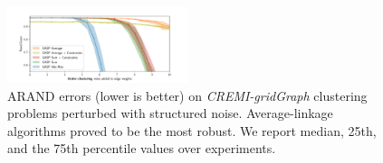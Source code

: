 

\begin{figure}[t]
\centering
\includegraphics[width=0.47\textwidth,trim=0.53in 0.1in 0.65in 0.45in,clip]{./figs/noise_plots/under_segment_plots_1.pdf}
        \caption{
ARAND errors (lower is better) on \emph{CREMI-gridGraph} clustering problems perturbed with structured noise. Average-linkage algorithms proved to be the most robust.
We report median, 25th, and the 75th percentile values over  experiments.
}\label{fig:scores_structured_noise}
\end{figure}


